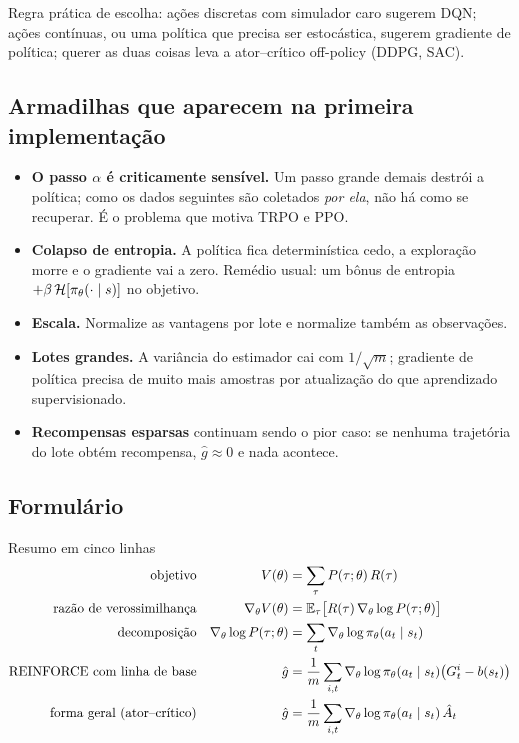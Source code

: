 \documentclass[11pt]{article}
\newcommand{\thv}{\theta}
\newcommand{\polth}{\pol_{\thv}}
\newcommand{\gth}{\nabla_{\thv}}
\newcommand{\traj}{\tau}
\newcommand{\Rtraj}{R(\traj)}
\newcommand{\Ptraj}{P(\traj;\thv)}
\newcommand{\Ahat}{\hat{A}}
\begin{document}
Regra prática de escolha: ações discretas com simulador caro sugerem DQN; ações
contínuas, ou uma política que precisa ser estocástica, sugerem gradiente de
política; querer as duas coisas leva a ator--crítico off-policy (DDPG, SAC).

\subsection{Armadilhas que aparecem na primeira implementação}

\begin{itemize}
  \item \textbf{O passo $\alpha$ é criticamente sensível.} Um passo grande demais
    destrói a política; como os dados seguintes são coletados \emph{por ela}, não
    há como se recuperar. É o problema que motiva TRPO e PPO.
  \item \textbf{Colapso de entropia.} A política fica determinística cedo, a
    exploração morre e o gradiente vai a zero. Remédio usual: um bônus de
    entropia $+\beta\,\mathcal{H}[\polth(\cdot\mid s)]$ no objetivo.
  \item \textbf{Escala.} Normalize as vantagens por lote e normalize também as
    observações.
  \item \textbf{Lotes grandes.} A variância do estimador cai com $1/\sqrt{m}$;
    gradiente de política precisa de muito mais amostras por atualização do que
    aprendizado supervisionado.
  \item \textbf{Recompensas esparsas} continuam sendo o pior caso: se nenhuma
    trajetória do lote obtém recompensa, $\hat g \approx 0$ e nada acontece.
\end{itemize}

\subsection{Formulário}

\begin{teobox}{Resumo em cinco linhas}
\begin{align*}
  \text{objetivo} &&
    V(\thv) &= \sum_{\traj}\Ptraj\,\Rtraj \\
  \text{razão de verossimilhança} &&
    \gth V(\thv) &= \E_{\traj}\bigl[\Rtraj\,\gth\log\Ptraj\bigr] \\
  \text{decomposição} &&
    \gth\log\Ptraj &= \sum_{t}\gth\log\polth(a_t\mid s_t) \\
  \text{REINFORCE com linha de base} &&
    \hat g &= \frac{1}{m}\sum_{i,t}\gth\log\polth(a_t\mid s_t)\bigl(G^i_t - b(s_t)\bigr) \\
  \text{forma geral (ator--crítico)} &&
    \hat g &= \frac{1}{m}\sum_{i,t}\gth\log\polth(a_t\mid s_t)\,\Ahat_t
\end{align*}
\end{teobox}
\end{document}

